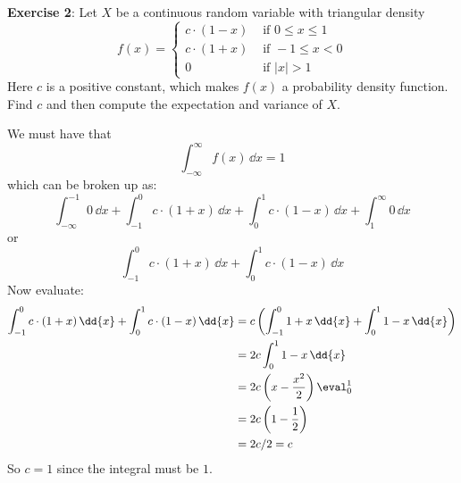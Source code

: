 \documentclass{article}
\begin{document}
\textbf{Exercise 2}: Let $X$ be a continuous random variable with triangular density
    \begin{equation*}
        f(x) = \begin{cases}
            c \cdot (1 - x) &\text{ if } 0 \leq x \leq 1 \\
            c \cdot (1 + x) &\text{ if } -1 \leq x < 0 \\
            0 &\text{ if } \lvert x \rvert > 1   
        \end{cases}
    \end{equation*}
Here $c$ is a positive constant, which makes $f(x)$ a probability density function. Find $c$ and then compute the expectation and variance of $X$.
    \begin{answer}
        We must have that 
            \begin{equation*}
                \int_{-\infty}^{\infty} f(x) \, \dd{x}  = 1
            \end{equation*}
        which can be broken up as:
            \begin{equation*}
                \int_{-\infty}^{-1} 0 \, \dd{x} + \int_{-1}^{0} c \cdot (1 + x) \, \dd{x}  + \int_{0}^{1} c \cdot (1 - x) \, \dd{x}  + \int_{1}^{\infty} 0 \, \dd{x} 
            \end{equation*}
        or 
            \begin{equation*}
                \int_{-1}^{0} c \cdot (1 + x) \, \dd{x}  + \int_{0}^{1} c \cdot (1 - x) \, \dd{x} 
            \end{equation*}
        Now evaluate:
            \begin{align*}
                \int_{-1}^{0} c \cdot (1 + x) \, \dd{x} + \int_{0}^{1} c \cdot (1 - x) \, \dd{x}  &= c\left(\int_{-1}^{0} 1 + x \, \dd{x} + \int_{0}^{1} 1 - x \, \dd{x} \right) \\
                                                                                                  &= 2c \int_{0}^{1} 1 - x \, \dd{x}                                             \\
                                                                                                  &= 2c \left(x - \dfrac{x^{2}}{2}\right)\eval_{0}^{1}                           \\
                                                                                                  &= 2c \left(1 - \dfrac{1}{2}\right)                                            \\
                                                                                                  &= 2c / 2 = c                                                                    
            \end{align*}
        So $c = 1$ since the integral must be $1$. 


\end{answer}
\end{document}
